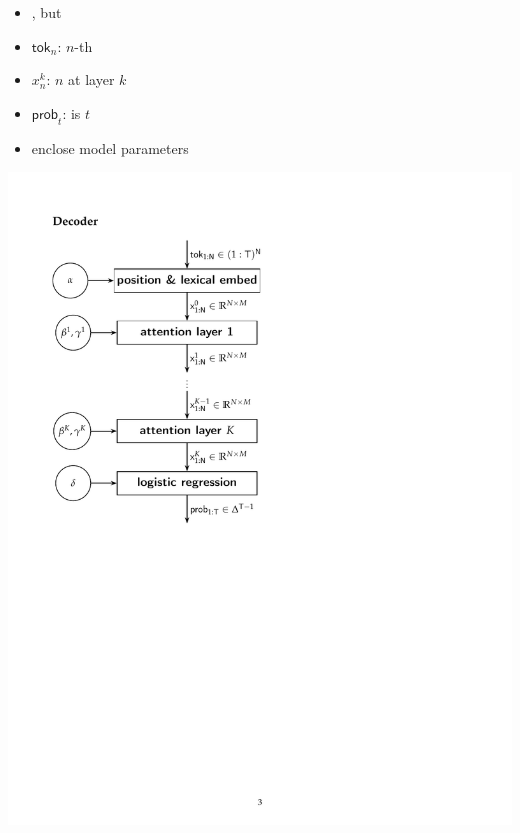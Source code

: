 \documentclass[9pt]{report}
\begin{document}
{
\begin{itemize}
\item {}, but 
\item $\textsf{tok}_n$:  $n$-th 
\item $x^k_n$:  $n$ at layer $k$
\item $\textsf{prob}_t$:  is $t$
\item {} enclose model parameters
\end{itemize}
\vspace*{-1.75in}
\hfill\includegraphics[height=\textheight]{img/transformer-diagram.pdf}

}
\end{document}
